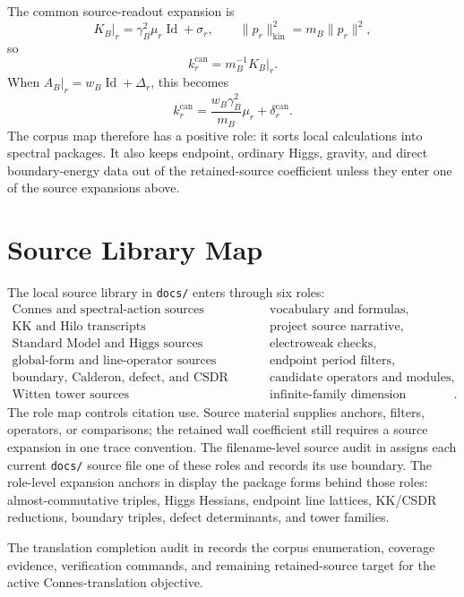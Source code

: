 \documentclass[11pt]{article}
\newcommand{\Id}{\operatorname{Id}}
\begin{document}
The common source-readout expansion is
\[
  K_B\vert_r=\gamma_B^2\mu_r\Id+\sigma_r,
  \qquad
  \|p_r\|_{\mathrm{kin}}^2=m_B\|p_r\|^2,
\]
so
\[
  k_r^{\mathrm{can}}=m_B^{-1}K_B\vert_r.
\]
When \(A_B\vert_r=w_B\Id+\Delta_r\), this becomes
\[
  k_r^{\mathrm{can}}
    =\frac{w_B\gamma_B^2}{m_B}\mu_r+\delta_r^{\mathrm{can}} .
\]
The corpus map therefore has a positive role: it sorts local calculations
into spectral packages.  It also keeps endpoint, ordinary Higgs, gravity,
and direct boundary-energy data out of the retained-source coefficient
unless they enter one of the source expansions above.

\section{Source Library Map}

The local source library in \texttt{docs/} enters through six roles:
\[
\begin{array}{ll}
\text{Connes and spectral-action sources} & \text{vocabulary and formulas},\\
\text{KK and Hilo transcripts} & \text{project source narrative},\\
\text{Standard Model and Higgs sources} & \text{electroweak checks},\\
\text{global-form and line-operator sources} & \text{endpoint period filters},\\
\text{boundary, Calderon, defect, and CSDR digests}
  & \text{candidate operators and modules},\\
\text{Witten tower sources} & \text{infinite-family dimension criterion}.
\end{array}
\]
The role map controls citation use.  Source material supplies anchors,
filters, operators, or comparisons; the retained wall coefficient still
requires a source expansion in one trace convention.
The filename-level source audit in \cite{ncg-source-file-coverage} assigns
each current \texttt{docs/} source file one of these roles and records its
use boundary.
The role-level expansion anchors in \cite{ncg-source-expansion-anchors}
display the package forms behind those roles: almost-commutative triples,
Higgs Hessians, endpoint line lattices, KK/CSDR reductions, boundary triples,
defect determinants, and tower families.

The translation completion audit in \cite{ncg-translation-completion-audit}
records the corpus enumeration, coverage evidence, verification commands, and
remaining retained-source target for the active Connes-translation objective.
\end{document}
